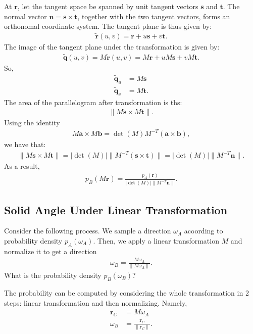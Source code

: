 \documentclass[10pt]{article}
\newcommand{\ve}[1]{\mathbf{#1}}
\begin{document}
  At $\ve{r}$, let the tangent space be spanned by unit tangent vectors $\ve{s}$ and $\ve{t}$.  The normal vector $\ve{n} = \ve{s} \times \ve{t}$, together with the two tangent vectors, forms an orthonomal coordinate system.  The tangent plane is thus given by:
  \begin{align*}
    \tilde{\ve{r}}(u,v) = \ve{r} + u\ve{s} + v\ve{t}.
  \end{align*}
  The image of the tangent plane under the transformation is given by:
  \begin{align*}
    \tilde{\ve{q}}(u,v) = M \tilde{\ve{r}}(u,v) = M\ve{r} + u M\ve{s} + v M\ve{t}.
  \end{align*}
  So,
  \begin{align*}
    \tilde{\ve{q}}_u &= M \ve{s} \\
    \tilde{\ve{q}}_v &= M \ve{t}.
  \end{align*}
  The area of the parallelogram after transformation is ths:
  \begin{align*}
    \| M\ve{s} \times M \ve{t} \|.
  \end{align*}
  Using the identity
  \begin{align*}
    M \ve{a} \times M \ve{b} = \det(M) M^{-T} (\ve{a} \times \ve{b}),
  \end{align*}
  we have that:
  \begin{align*}
    \| M\ve{s} \times M \ve{t} \| = |\det(M)| \| M^{-T} (\ve{s} \times \ve{t}) \| = |\det(M)| \| M^{-T}\ve{n} \|.
  \end{align*}
  As a result,
  \begin{align*}
    p_B(M\ve{r}) = \frac{p_A(\ve{r})}{|\det(M)| \| M^{-T} \ve{n} \|}.
  \end{align*}

  \subsection{Solid Angle Under Linear Transformation}
  \label{solid-angle-linear-xform}

  Consider the following process.  We sample a direction $\omega_A$ acoording to probability density $p_A(\omega_A)$.  Then, we apply a linear transformation $M$ and normalize it to get a direction
  \begin{align*}
    \omega_B = \frac{M\omega_A}{\| M \omega_A \|}.
  \end{align*}
  What is the probability density $p_B(\omega_B)$?

  The probability can be computed by considering the whole transformation in 2 steps: linear transformation and then normalizing.  Namely,
  \begin{align*}
    \ve{r}_C &= M \omega_A \\
    \omega_B &= \frac{\ve{r}_C}{\| \ve{r}_C \|}.
  \end{align*}
\end{document}
